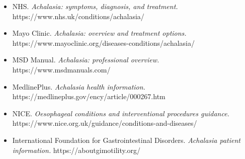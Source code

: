 \begin{itemize}
    \item NHS. \textit{Achalasia: symptoms, diagnosis, and treatment.} https://www.nhs.uk/conditions/achalasia/
    \item Mayo Clinic. \textit{Achalasia: overview and treatment options.} https://www.mayoclinic.org/diseases-conditions/achalasia/
    \item MSD Manual. \textit{Achalasia: professional overview.} https://www.msdmanuals.com/
    \item MedlinePlus. \textit{Achalasia health information.} https://medlineplus.gov/ency/article/000267.htm
    \item NICE. \textit{Oesophageal conditions and interventional procedures guidance.} https://www.nice.org.uk/guidance/conditions-and-diseases/
    \item International Foundation for Gastrointestinal Disorders. \textit{Achalasia patient information.} https://aboutgimotility.org/
\end{itemize}
